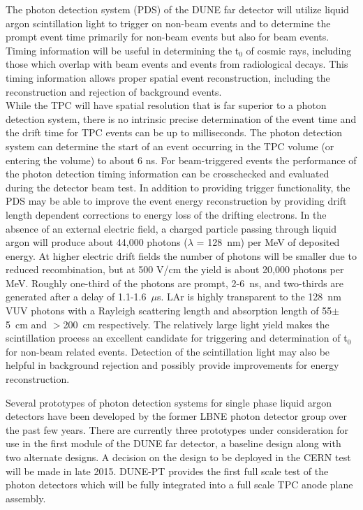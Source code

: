 



The photon detection system (PDS) of the DUNE far detector will utilize liquid argon scintillation light to trigger on non-beam events and to
determine the prompt event time primarily for non-beam events but also for beam events. 
Timing information will be useful in determining the t$_0$ of cosmic rays, including those which 
overlap with beam events and events from radiological decays. This timing information allows proper spatial event reconstruction, including 
the reconstruction and rejection of background events.\\
%
While the TPC will have spatial resolution that is far superior to a photon detection system, there is no intrinsic precise determination of the event time and the drift time for TPC events can be up to milliseconds. The photon detection system can determine the start of an event occurring in the TPC volume (or entering the volume) to about 6 ns. For beam-triggered events the performance of the photon detection timing information can be crosschecked and evaluated during the detector beam test. In addition to providing trigger functionality, the PDS may be able to improve the event energy reconstruction by providing drift length dependent corrections to energy loss of the drifting electrons.
In the absence of an external electric field, a charged particle passing through liquid argon will produce about 44,000 photons ($\lambda$ = 128~nm) per MeV of deposited energy. 
At higher electric drift fields the number of photons will be smaller due to reduced recombination, but at 500 V/cm the yield is about 20,000 photons per MeV. Roughly one-third of the photons are prompt, 2-6~ns, and two-thirds are generated after a delay of 1.1-1.6~$\mu$s. LAr is highly transparent to the 128~nm VUV photons with a Rayleigh scattering length and absorption length of 55$\pm$5~cm \cite{rayleigh} and $>$200~cm \cite{absorption} respectively. The relatively large light yield makes the scintillation process an excellent candidate for triggering and  determination of t$_0$ for non-beam related events. Detection of the scintillation light may also be helpful in background rejection and possibly
provide improvements for energy reconstruction.

Several prototypes of photon detection systems for single phase liquid argon detectors have been developed by the former LBNE photon detector group over the past few years. There are currently three prototypes under consideration for use in the first module of the DUNE far detector, a baseline design along with two alternate designs. A decision on the design to be deployed in the CERN test will be made in late 2015. 
DUNE-PT provides the first full scale test of the photon detectors which will be fully integrated into a 
full scale TPC anode plane assembly. 

